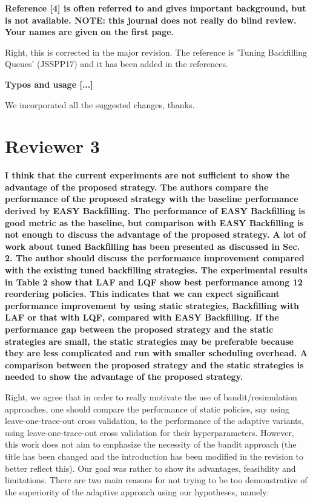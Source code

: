 \documentclass[]{article}
\begin{document}
\textbf{Reference [4] is often referred to and gives important background, but
is not available. NOTE: this journal does not really do blind review. Your
names are given on the first page.}

Right, this is corrected in the major revision. The reference is 'Tuning Backfilling Queues' (JSSPP17)
and it has been added in the references.
\medskip

\textbf{Typos and usage [...]}

We incorporated all the suggested changes, thanks.
\medskip


\section{Reviewer 3}

\textbf{I think that the current experiments are not sufficient to show the advantage of the proposed strategy.
The authors compare the performance of the proposed strategy with the baseline performance derived by EASY Backfilling. The performance of EASY Backfilling is good metric as the baseline, but comparison with EASY Backfilling is not enough to discuss the advantage of the proposed strategy. A lot of work about tuned Backfilling has been presented as discussed in Sec. 2. The author should discuss the performance improvement compared with the existing tuned backfilling strategies.
The experimental results in Table 2 show that LAF and LQF show best performance among 12 reordering policies. This indicates that we can expect significant performance improvement by using static strategies, Backfilling with LAF or that with LQF, compared with EASY Backfilling. If the performance gap between the proposed strategy and the static strategies are small, the static strategies may be preferable because they are less complicated and run with smaller scheduling overhead. A comparison between the proposed strategy and the static strategies is needed to show the advantage of the proposed strategy.}

Right, we agree that in order to really motivate the use of
bandit/resimulation approaches, one should compare the performance of static
policies, say using leave-one-trace-out cross validation, to the performance of
the adaptive variants, using leave-one-trace-out cross validation for their
hyperparameters.
However, this work does not aim to emphasize the necessity of the bandit
approach (the title has been changed and the introduction has been modified in the 
revision to better reflect this). Our goal was rather to show its advantages,
feasibility and limitations. 
There are two main reasons for not trying to be too demonstrative of the superiority
of the adaptive approach using our hypotheses, namely:
\end{document}
